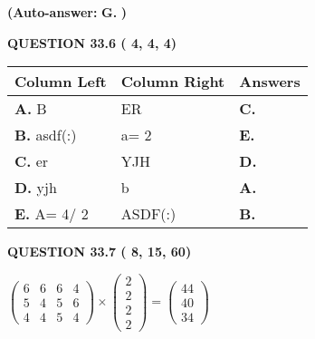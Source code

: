 \documentclass[12pt]{article}
\begin{document}
 
{\textbf{(Auto-answer:}}
{\textbf{\large{
G.}}}
{\textbf{)}}
 
 
  
  
{\textbf{\large{QUESTION
33.6 
 (          4,          4,          4)
}}}
 
 
\noindent{}
  
  
\begin{tabular}{|l|l|l|}
 \hline
 Column Left & Column Right  & Answers       \\ 
 \hline
{\textbf{\large{
A.}}}
B
  & 
ER
 & 
{\textbf{\large{
C.}}}
 \\ 
 \hline
{\textbf{\large{
B.}}}
asdf(:)
  & 
 a= %
2
 & 
{\textbf{\large{
E.}}}
 \\ 
 \hline
{\textbf{\large{
C.}}}
er
  & 
YJH
 & 
{\textbf{\large{
D.}}}
 \\ 
 \hline
{\textbf{\large{
D.}}}
yjh
  & 
b
 & 
{\textbf{\large{
A.}}}
 \\ 
 \hline
{\textbf{\large{
E.}}}
 A= %
4/ %
2

  & 
ASDF(:)
 & 
{\textbf{\large{
B.}}}
 \\ 
 \hline
 \end{tabular}
  
  
\noindent{}
 
 
  
  
{\textbf{\large{QUESTION
33.7 
 (          8,         15,         60)
}}}

 
$\left( \begin{array}{ccccccccccccccc}
           6 & 
           6 & 
           6 & 
           4 \\ 
           5 & 
           4 & 
           5 & 
           6 \\ 
           4 & 
           4 & 
           5 & 
           4
\end{array}\right) \times
\left( \begin{array}{c}
           2 \\ 
           2 \\ 
           2 \\ 
           2
\end{array}\right)  =
\left( \begin{array}{c}
          44 \\ 
          40 \\ 
          34
\end{array}\right)  $
 
\end{document}
